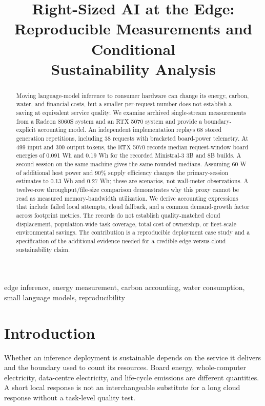\documentclass[conference]{IEEEtran}
\begin{document}
\title{Right-Sized AI at the Edge:\\
Reproducible Measurements and Conditional\\
Sustainability Analysis}
\author{
}
\maketitle
\pagestyle{plain}
\thispagestyle{plain}

\begin{abstract}
Moving language-model inference to consumer hardware can change its energy,
carbon, water, and financial costs, but a smaller per-request number does not
establish a saving at equivalent service quality. We examine archived
single-stream measurements from a Radeon 8060S system and an RTX 5070 system
and provide a boundary-explicit accounting model. An independent implementation
replays 68 stored generation repetitions, including 38 requests with
bracketed board-power telemetry. At 499 input and 300 output tokens, the
RTX 5070 records median request-window board energies of 0.091 Wh and 0.19 Wh
for the recorded Ministral-3 3B and 8B builds. A second session on the same
machine gives the same rounded medians. Assuming 60 W of additional host
power and 90\% supply efficiency changes the primary-session estimates to
0.13 Wh and 0.27 Wh; these are scenarios, not wall-meter observations.
A twelve-row throughput/file-size comparison demonstrates why this
proxy cannot be read as measured memory-bandwidth utilization.
We derive accounting expressions that include failed local attempts,
cloud fallback, and a common demand-growth factor across footprint metrics.
The records do not establish quality-matched cloud displacement,
population-wide task coverage, total cost of ownership, or fleet-scale
environmental savings. The contribution is a reproducible deployment case
study and a specification of the additional evidence needed for a credible
edge-versus-cloud sustainability claim.
\end{abstract}
\begin{IEEEkeywords}
edge inference, energy measurement, carbon accounting, water consumption,
small language models, reproducibility
\end{IEEEkeywords}

\section{Introduction}
Whether an inference deployment is sustainable depends on the service it
delivers and the boundary used to count its resources. Board energy,
whole-computer electricity, data-centre electricity, and life-cycle emissions
are different quantities. A short local response is not an interchangeable
substitute for a long cloud response without a task-level quality test.
\end{document}
